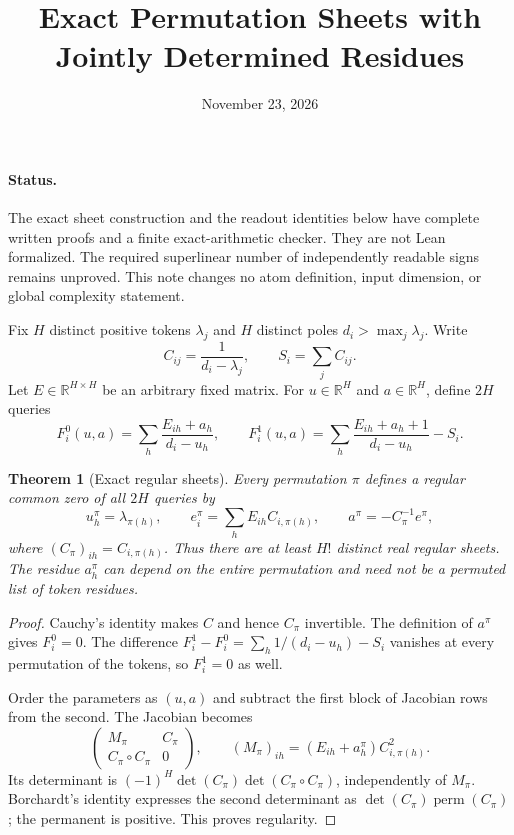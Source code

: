 \documentclass[11pt]{article}
\title{Exact Permutation Sheets with Jointly Determined Residues}
\author{}
\date{November 23, 2026}
\newtheorem{theorem}{Theorem}
\begin{document}
\maketitle

\paragraph{Status.}
The exact sheet construction and the readout identities below have
complete written proofs and a finite exact-arithmetic checker. They
are not Lean formalized. The required superlinear number of independently
readable signs remains unproved. This note changes no atom definition,
input dimension, or global complexity statement.

Fix $H$ distinct positive tokens $\lambda_j$ and $H$ distinct poles
$d_i>\max_j\lambda_j$. Write
\[
 C_{ij}=\frac1{d_i-\lambda_j},\qquad S_i=\sum_jC_{ij}.
\]
Let $E\in\mathbb R^{H\times H}$ be an arbitrary fixed matrix.
For $u\in\mathbb R^H$ and $a\in\mathbb R^H$, define $2H$ queries
\[
 F_i^0(u,a)=\sum_h\frac{E_{ih}+a_h}{d_i-u_h},\qquad
 F_i^1(u,a)=\sum_h\frac{E_{ih}+a_h+1}{d_i-u_h}-S_i.
\]

\begin{theorem}[Exact regular sheets]
Every permutation $\pi$ defines a regular common zero of all $2H$
queries by
\[
 u_h^\pi=\lambda_{\pi(h)},\qquad
 e_i^\pi=\sum_hE_{ih}C_{i,\pi(h)},\qquad
 a^\pi=-C_\pi^{-1}e^\pi,
\]
where $(C_\pi)_{ih}=C_{i,\pi(h)}$.
Thus there are at least $H!$ distinct real regular sheets. The residue
$a_h^\pi$ can depend on the entire permutation and need not be a
permuted list of token residues.
\end{theorem}
\begin{proof}
Cauchy's identity makes $C$ and hence $C_\pi$ invertible.
The definition of $a^\pi$ gives $F_i^0=0$. The difference
$F_i^1-F_i^0=\sum_h1/(d_i-u_h)-S_i$ vanishes at every permutation
of the tokens, so $F_i^1=0$ as well.

Order the parameters as $(u,a)$ and subtract the first block of
Jacobian rows from the second. The Jacobian becomes
\[
 \begin{pmatrix}M_\pi&C_\pi\\C_\pi\circ C_\pi&0\end{pmatrix},
 \qquad
 (M_\pi)_{ih}=(E_{ih}+a_h^\pi)C_{i,\pi(h)}^2.
\]
Its determinant is
$(-1)^H\det(C_\pi)\det(C_\pi\circ C_\pi)$, independently of
$M_\pi$. Borchardt's identity expresses the second determinant as
$\det(C_\pi)\operatorname{perm}(C_\pi)$; the permanent is positive.
This proves regularity.
\end{proof}
\end{document}
